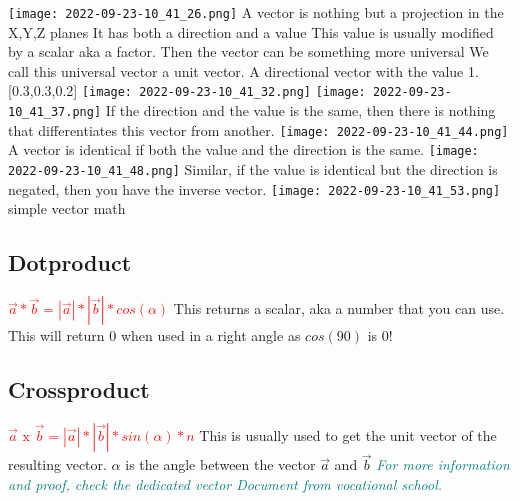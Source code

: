 \documentclass[main.tex,fontsize=8pt,paper=a4,paper=portrait,DIV=calc,]{scrartcl}
\begin{document}
\begin{multicols*}{2}
\texttt{[image: 2022-09-23-10\_41\_26.png]}
{A vector is nothing but a projection in the X,Y,Z planes \newline 
It has both a direction and a value \newline
This value is usually modified by a scalar aka a factor. Then the vector can be something more universal \newline
We call this universal vector a unit vector. A directional vector with the value 1.}[0.3,0.3,0.2]\newline
\texttt{[image: 2022-09-23-10\_41\_32.png]}
\texttt{[image: 2022-09-23-10\_41\_37.png]}\newline
If the direction and the value is the same, then there is nothing that differentiates this vector from another.\newline
\texttt{[image: 2022-09-23-10\_41\_44.png]}\newline
A vector is identical if both the value and the direction is the same.\newline
\texttt{[image: 2022-09-23-10\_41\_48.png]}\newline 
Similar, if the value is identical but the direction is negated, then you have the inverse vector.\newline
\texttt{[image: 2022-09-23-10\_41\_53.png]}\newline 
simple vector math \newline
\subsection{Dotproduct}
\Large{\textbf{\textcolor{red}{\( \vec{a} * \vec{b} = |\vec{a}| * |\vec{b}| * cos(\alpha) \)}}}\newline
\normalsize This returns a scalar, aka a number that you can use.\newline
This will return 0 when used in a right angle as \(cos(90)\) is 0!\\
\subsection{Crossproduct}
\Large{\textbf{\textcolor{red}{\( \vec{a} \text{ x } \vec{b} = |\vec{a}| * |\vec{b}| * sin(\alpha) * n \)}}}\newline
\normalsize This is usually used to get the unit vector of the resulting vector.\newline
\(\alpha\) is the angle between the vector \(\vec{a}\) and \(\vec{b}\)\newline
\emph{\textcolor{teal}{For more information and proof, check the dedicated vector Document from vocational school.}}\\


\end{multicols*}
\end{document}
